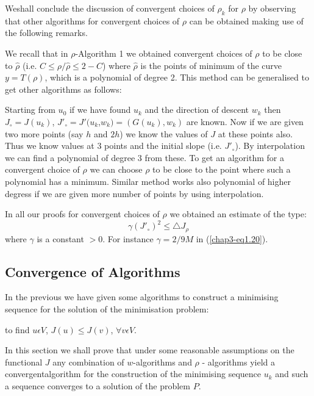 We\pageoriginale shall conclude the discussion of convergent choices of $\rho_{k}$ for $\rho$ by observing that other algorithms for convergent choices of $\rho$ can be obtained making use of the following remarks.

\begin{remark}\label{chap3-rem1.3}
We recall that in $\rho$-Algorithm 1 we obtained convergent choices of $\rho$ to be close to $\hat{\rho}$ (i.e. $C \leq \rho/\hat{\rho} \leq 2 - C$) where $\hat{\rho}$ is the points of minimum of the curve $y = T(\rho)$, which is a polynomial of degree 2. This method can be generalised to get other algorithms as follows:
\end{remark}

Starting from $u_{0}$ if we have found $u_{k}$ and the direction of descent $w_{k}$ then $J_{\circ} = J(u_{k})$, ${J'}_{\circ} = J'(u_{k}$,$ w_{k}) = (G(u_{k}), w_{k})$ are known. Now if we are given two more points (say $h$ and $2h$) we know the values of $J$ at these points also. Thus we know values at 3 points and the initial slope (i.e. ${J'}_{\circ}$). By interpolation we can find a polynomial of degree 3 from these. To get an algorithm for a convergent choice of $\rho$ we can choose $\rho$ to be close to the point where such a polynomial has a minimum. Similar method works also polynomial of higher degress if we are given more number of points by using interpolation.

\begin{remark}\label{chap3-rem1.4}
In all our proofs for convergent choices of $\rho$ we obtained an estimate of the type: 
$$
\gamma ({J'}_{\circ})^{2} \leq \triangle J_{\rho}
$$
where $\gamma$ is a constant $> 0$. For instance $\gamma = 2/9M$ in (\ref{chap3-eq1.20}).
\end{remark}

\subsection{Convergence of Algorithms}\label{chap3-subsec1.4}

In the previous we have given some algorithms to construct a minimising sequence for the solution of the minimisation problem:

\medskip
{}
 to find $u \epsilon V$, $J(u) \leq J(v)$, $\forall v \epsilon V$.

In this section we shall prove that under some reasonable assumptions
on the functional $J$ any combination of $w$-algorithms and
$\rho$ - algorithms yield a convergent\pageoriginale algorithm for the
construction of the minimising sequence $u_{k}$ and such a sequence
converges to a solution of the problem $P$. 

